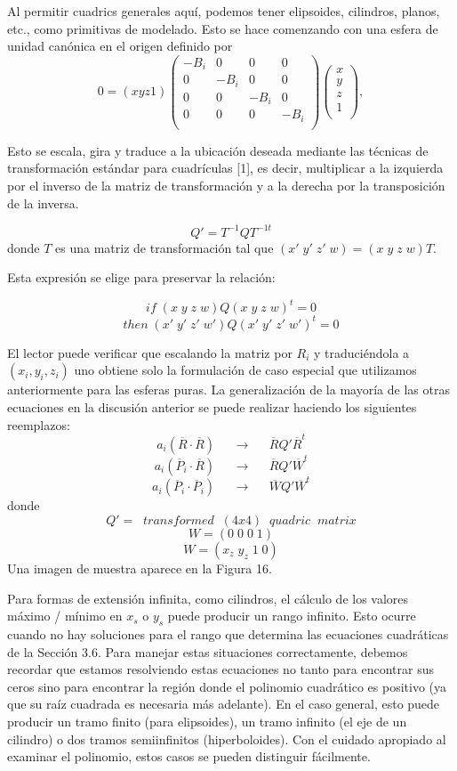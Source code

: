 Al permitir cuadrics generales aquí, podemos tener elipsoides, cilindros, planos, etc., como primitivas de modelado. Esto se hace comenzando con una esfera de unidad canónica en el origen definido por
\[
	0 = (xyz1) \left( {\begin{array}{cccc}
		-B_i & 0 & 0 & 0 \\
		0 & -B_i & 0 & 0 \\
		0 & 0 & -B_i & 0 \\
		0 & 0 & 0 & -B_i \\
		\end{array} } \right) \left( {\begin{array}{cccc}
		x \\
		y \\
		z \\
		1 \\
		\end{array} } \right),
\]

Esto se escala, gira y traduce a la ubicación deseada mediante las técnicas de transformación estándar para cuadrículas [1], es decir, multiplicar a la izquierda por el inverso de la matriz de transformación y a la derecha por la transposición de la inversa.

\[
	Q' = T^{-1}QT^{-1t}
\]
donde $T$ es una matriz de transformación tal que $(x' \; y' \; z' \; w) = (x \; y \; z \; w)T$.

Esta expresión se elige para preservar la relación:

\[
	if \; (x\;y\;z\;w)Q(x\;y\;z\;w)^{t} = 0
\]
\[
	then \; (x'\;y'\;z'\;w')Q(x'\;y'\;z'\;w')^{t} = 0
\]

El lector puede verificar que escalando la matriz por $ R_i $ y traduciéndola a $ (x_i, y_i, z_i) $ uno obtiene solo la formulación de caso especial que utilizamos anteriormente para las esferas puras. La generalización de la mayoría de las otras ecuaciones en la discusión anterior se puede realizar haciendo los siguientes reemplazos:
\[
	a_i(\overline{R} \cdot \overline{R}) \;\;\;\;\; \to \;\;\;\;\; \overline{R}Q'\overline{R}^t
\]
\[
	a_i(\overline{P}_i \cdot \overline{R}) \;\;\;\;\; \to \;\;\;\;\; \overline{R}Q'\overline{W}^t
\]
\[
	a_i(\overline{P}_i \cdot \overline{P}_i) \;\;\;\;\; \to \;\;\;\;\; \overline{W}Q'\overline{W}^t
\]
donde
\[
	Q' = \;\; transformed \;\; (4x4) \;\; quadric \;\; matrix
\]
\[
	W = (0\;0\;0\;1)
\]
\[
	W = (x_z\;y_z\;1\;0)
\]
Una imagen de muestra aparece en la Figura 16.

Para formas de extensión infinita, como cilindros, el cálculo de los valores máximo / mínimo en $ x_s $ o $ y_s $ puede producir un rango infinito. Esto ocurre cuando no hay soluciones para el rango que determina las ecuaciones cuadráticas de la Sección 3.6. Para manejar estas situaciones correctamente, debemos recordar que estamos resolviendo estas ecuaciones no tanto para encontrar sus ceros sino para encontrar la región donde el polinomio cuadrático es positivo (ya que su raíz cuadrada es necesaria más adelante). En el caso general, esto puede producir un tramo finito (para elipsoides), un tramo infinito (el eje de un cilindro) o dos tramos semiinfinitos (hiperboloides). Con el cuidado apropiado al examinar el polinomio, estos casos se pueden distinguir fácilmente.

